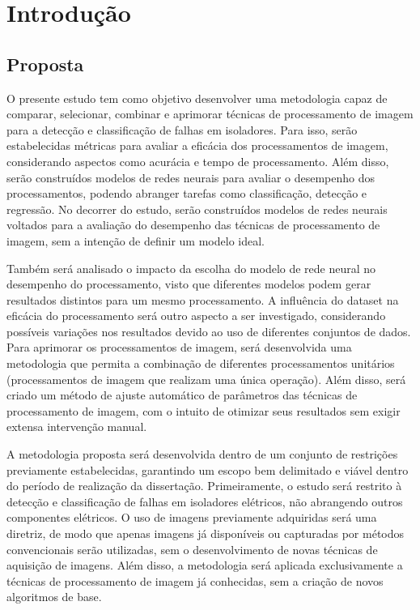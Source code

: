 \chapter{Introdução}

\section{Proposta}

O presente estudo tem como objetivo desenvolver uma metodologia capaz de comparar, selecionar, combinar e aprimorar técnicas de processamento de imagem para a detecção e classificação de falhas em isoladores. Para isso, serão estabelecidas métricas para avaliar a eficácia dos processamentos de imagem, considerando aspectos como acurácia e tempo de processamento. Além disso, serão construídos modelos de redes neurais para avaliar o desempenho dos processamentos, podendo abranger tarefas como classificação, detecção e regressão. No decorrer do estudo, serão construídos modelos de redes neurais voltados para a avaliação do desempenho das técnicas de processamento de imagem, sem a intenção de definir um modelo ideal.

Também será analisado o impacto da escolha do modelo de rede neural no desempenho do processamento, visto que diferentes modelos podem gerar resultados distintos para um mesmo processamento. A influência do dataset na eficácia do processamento será outro aspecto a ser investigado, considerando possíveis variações nos resultados devido ao uso de diferentes conjuntos de dados. Para aprimorar os processamentos de imagem, será desenvolvida uma metodologia que permita a combinação de diferentes processamentos unitários (processamentos de imagem que realizam uma única operação). Além disso, será criado um método de ajuste automático de parâmetros das técnicas de processamento de imagem, com o intuito de otimizar seus resultados sem exigir extensa intervenção manual.

A metodologia proposta será desenvolvida dentro de um conjunto de restrições previamente estabelecidas, garantindo um escopo bem delimitado e viável dentro do período de realização da dissertação. Primeiramente, o estudo será restrito à detecção e classificação de falhas em isoladores elétricos, não abrangendo outros componentes elétricos. O uso de imagens previamente adquiridas será uma diretriz, de modo que apenas imagens já disponíveis ou capturadas por métodos convencionais serão utilizadas, sem o desenvolvimento de novas técnicas de aquisição de imagens. Além disso, a metodologia será aplicada exclusivamente a técnicas de processamento de imagem já conhecidas, sem a criação de novos algoritmos de base.

